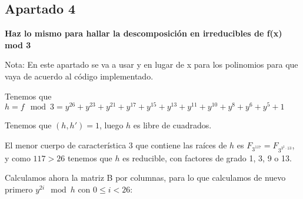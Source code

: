 \documentclass[a4paper]{article}
\begin{document}
\subsection{Apartado 4}
\textbf{Haz lo mismo para hallar la descomposición en irreducibles de f(x) mod 3}

Nota: En este apartado se va a usar y en lugar de x para los polinomios para que vaya de acuerdo al código implementado.

Tenemos que $h = f \mod 3 = y^{26} + y^{23} + y^{21} + y^{17} + y^{15} + y^{13} + y^{11} + y^{10} + y^8 + y^6 + y^5 + 1$

Tenemos que $(h, h')=1$, luego $h$ es libre de cuadrados.

El menor cuerpo de característica 3 que contiene las raíces de $h$ es $F_{3^{117}}=F_{3^{3^2\cdot 13}}$, y como $117>26$ tenemos que $h$ es reducible, con factores de grado 1, 3, 9 o 13.

Calculamos ahora la matriz B por columnas, para lo que calculamos de nuevo primero $y^{2i}\mod h$ con $0\leq i < 26$:
\end{document}
